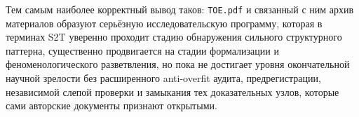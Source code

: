 \documentclass[12pt,a4paper]{article}
\begin{document}
Тем самым наиболее корректный вывод таков: \texttt{TOE.pdf} и связанный с ним архив материалов образуют серьёзную исследовательскую программу, которая в терминах S2T уверенно проходит стадию обнаружения сильного структурного паттерна, существенно продвигается на стадии формализации и феноменологического разветвления, но пока не достигает уровня окончательной научной зрелости без расширенного anti-overfit аудита, предрегистрации, независимой слепой проверки и замыкания тех доказательных узлов, которые сами авторские документы признают открытыми.
\end{document}
